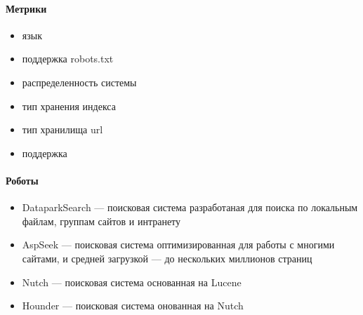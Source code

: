 \paragraph{Метрики}
\begin{itemize}
 \item язык
 \item поддержка robots.txt
 \item распределенность системы
 \item тип хранения индекса
 \item тип хранилища url
 \item поддержка
\end{itemize}
\paragraph{Роботы}
\begin{itemize}
 \item DataparkSearch --- поисковая система разработаная для поиска по локальным файлам, группам сайтов и интранету
 \item AspSeek --- поисковая система оптимизированная для работы с многими сайтами, и средней загрузкой --- до нескольких миллионов страниц
 \item Nutch --- поисковая система основанная на Lucene
 \item Hounder --- поисковая система онованная на Nutch
\end{itemize}

